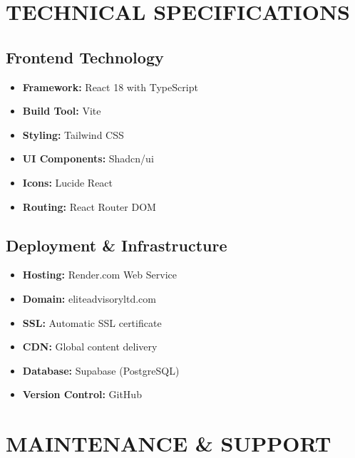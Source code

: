 \documentclass[11pt,a4paper]{article}
\begin{document}
\vspace{1cm}

\section*{\color{primaryBlue}TECHNICAL SPECIFICATIONS}

\subsection*{Frontend Technology}
\begin{itemize}[leftmargin=2cm]
    \item \textbf{Framework:} React 18 with TypeScript
    \item \textbf{Build Tool:} Vite
    \item \textbf{Styling:} Tailwind CSS
    \item \textbf{UI Components:} Shadcn/ui
    \item \textbf{Icons:} Lucide React
    \item \textbf{Routing:} React Router DOM
\end{itemize}

\subsection*{Deployment \& Infrastructure}
\begin{itemize}[leftmargin=2cm]
    \item \textbf{Hosting:} Render.com Web Service
    \item \textbf{Domain:} eliteadvisoryltd.com
    \item \textbf{SSL:} Automatic SSL certificate
    \item \textbf{CDN:} Global content delivery
    \item \textbf{Database:} Supabase (PostgreSQL)
    \item \textbf{Version Control:} GitHub
\end{itemize}

\vspace{1cm}

\section*{\color{primaryBlue}MAINTENANCE \& SUPPORT}
\end{document}
